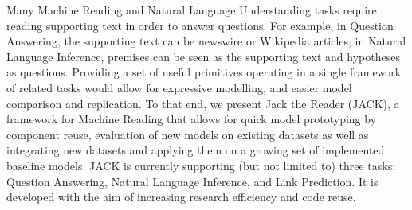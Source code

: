 Many Machine Reading and Natural Language Understanding tasks require reading supporting text in order to answer questions. For example, in Question Answering, the supporting text can be newswire or Wikipedia articles; in Natural Language Inference, premises can be seen as the supporting text and hypotheses as questions. Providing a set of useful primitives operating in a single framework of related tasks would allow for expressive modelling, and easier model comparison and replication. To that end, we present Jack the Reader (JACK), a framework for Machine Reading that allows for quick model prototyping by component reuse, evaluation of new models on existing datasets as well as integrating new datasets and applying them on a growing set of implemented baseline models. JACK is currently supporting (but not limited to) three tasks: Question Answering, Natural Language Inference, and Link Prediction. It is developed with the aim of increasing research efficiency and code reuse.
